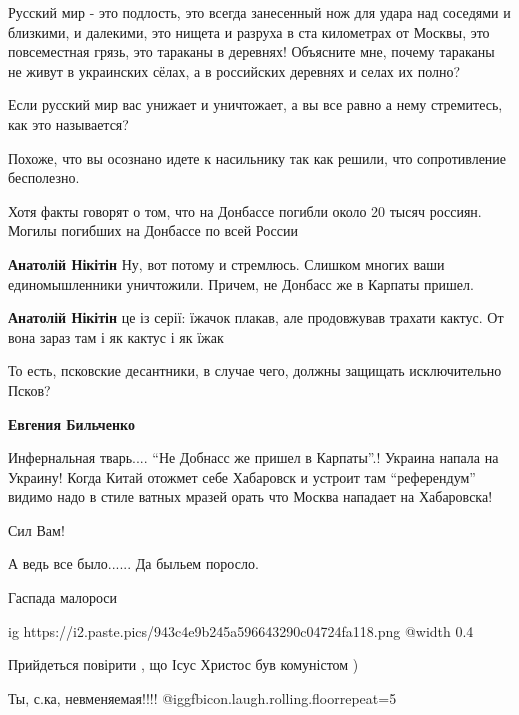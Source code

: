 \begin{itemize}
\begin{itemize}
\end{itemize} %


Русский мир - это подлость, это всегда занесенный нож для удара над соседями и
близкими, и далекими, это нищета и разруха в ста километрах от Москвы, это
повсеместная грязь, это тараканы в деревнях! Объясните мне, почему тараканы не
живут в украинских сёлах, а в российских деревнях и селах их полно?



Если русский мир вас унижает и уничтожает, а вы все равно а нему стремитесь,
как это называется?

Похоже, что вы осознано идете к насильнику так как решили, что сопротивление
бесполезно.

Хотя факты говорят о том, что на Донбассе погибли около 20 тысяч россиян.
Могилы погибших на Донбассе по всей России

\begin{itemize} %
\textbf{Анатолій Нікітін} Ну, вот потому и стремлюсь. Слишком многих ваши единомышленники уничтожили. Причем, не Донбасс же в Карпаты пришел.

\textbf{Анатолій Нікітін} це із серії: їжачок плакав, але продовжував трахати кактус. От вона зараз там і як кактус і як їжак

То есть, псковские десантники, в случае чего, должны защищать исключительно Псков?

\textbf{Евгения Бильченко} 

Инфернальная тварь.... \enquote{Не Добнасс же пришел в Карпаты}.! Украина напала на
Украину! Когда Китай отожмет себе Хабаровск и устроит там \enquote{референдум} видимо
надо в стиле ватных мразей орать что Москва нападает на Хабаровска!

\end{itemize} %

Сил Вам!

А ведь все было...... Да быльем поросло.

Гаспада малороси

\ifcmt
  ig https://i2.paste.pics/943c4e9b245a596643290c04724fa118.png
  @width 0.4
\fi

Прийдеться повірити , що Ісус Христос був комуністом )

Ты, с.ка, невменяемая!!!! @igg{fbicon.laugh.rolling.floor}{repeat=5} 


\end{itemize}
